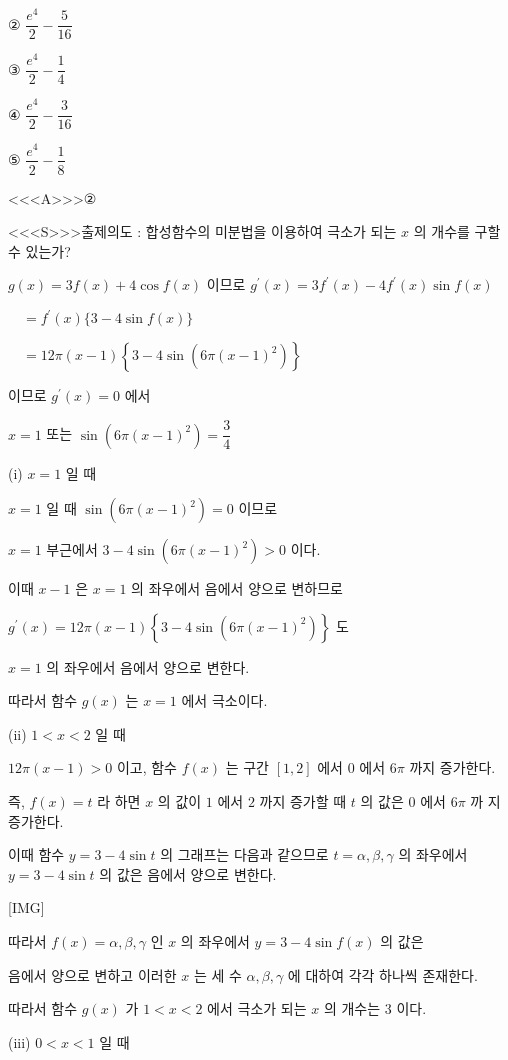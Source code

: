 \documentclass{oblivoir}
\begin{document}
② $\dfrac{e^{4}}{2}-\dfrac{5}{16}$

③ $\dfrac{e^{4}}{2}-\dfrac{1}{4}$

④ $\dfrac{e^{4}}{2}-\dfrac{3}{16}$

⑤ $\dfrac{e^{4}}{2}-\dfrac{1}{8}$


<<<A>>>②

<<<S>>>출제의도 : 합성함수의 미분법을 이용하여 극소가 되는 $x$ 의 개수를 구할 수 있는가?

$g(x)=3 f(x)+4 \cos f(x)$ 이므로
$g^{\prime}(x)=3 f^{\prime}(x)-4 f^{\prime}(x) \sin f(x)$

$\quad=f^{\prime}(x)\{3-4 \sin f(x)\}$

$\quad=12 \pi(x-1)\left\{3-4 \sin \left(6 \pi(x-1)^{2}\right)\right\}$

이므로 $g^{\prime}(x)=0$ 에서

$x=1$ 또는 $\sin \left(6 \pi(x-1)^{2}\right)=\dfrac{3}{4}$

(i) $x=1$ 일 때

$x=1$ 일 때 $\sin \left(6 \pi(x-1)^{2}\right)=0$ 이므로

$x=1$ 부근에서 $3-4 \sin \left(6 \pi(x-1)^{2}\right)>0$
이다.

이때 $x-1$ 은 $x=1$ 의 좌우에서 음에서 양으로 변하므로

$g^{\prime}(x)=12 \pi(x-1)\left\{3-4 \sin \left(6 \pi(x-1)^{2}\right)\right\}$ 도

$x=1$ 의 좌우에서 음에서 양으로 변한다.

따라서 함수 $g(x)$ 는 $x=1$ 에서 극소이다.

(ii) $1<  x<  2$ 일 때

$12 \pi(x-1)>0$ 이고, 함수 $f(x)$ 는 구간 $[1,2]$ 에서 $0$ 에서 $6 \pi$ 까지 증가한다.

즉, $f(x)=t$ 라 하면 $x$ 의 값이 $1$ 에서 $2$ 까지 증가할 때 $t$ 의 값은 $0$ 에서 $6 \pi$ 까
지 증가한다.

이때 함수 $y=3-4 \sin t$ 의 그래프는 다음과 같으므로 $t=\alpha, \beta, \gamma$ 의 좌우에서
$y=3-4 \sin t$ 의 값은 음에서 양으로 변한다.

[IMG]

따라서 $f(x)=\alpha, \beta, \gamma$ 인 $x$ 의 좌우에서 $y=3-4 \sin f(x)$ 의 값은

음에서 양으로 변하고 이러한 $x$ 는 세 수 $\alpha, \beta, \gamma$ 에 대하여 각각 하나씩 존재한다.

따라서 함수 $g(x)$ 가 $1<  x<  2$ 에서 극소가 되는 $x$ 의 개수는 $3$ 이다.

(iii) $0<  x<  1$ 일 때
\end{document}
